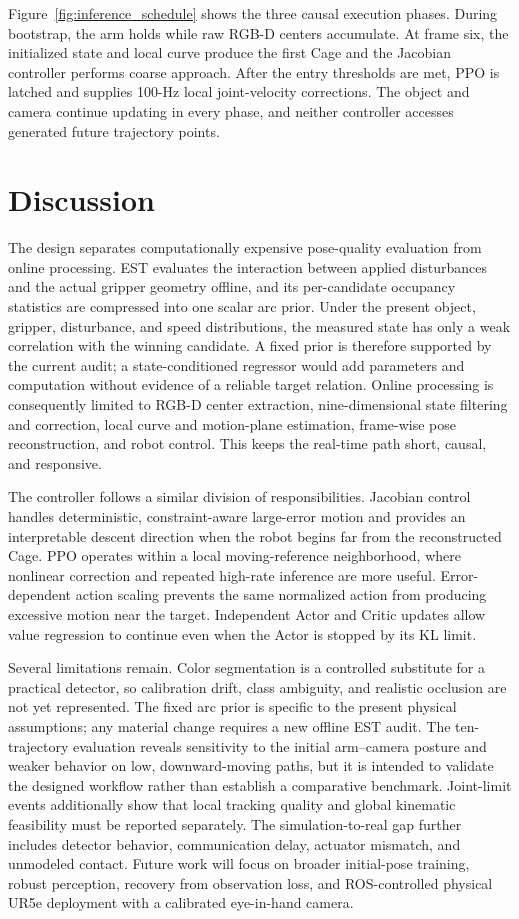 \documentclass[conference]{IEEEtran}
\begin{document}
Figure~\ref{fig:inference_schedule} shows the three causal execution phases. During bootstrap, the arm holds while raw RGB-D centers accumulate. At frame six, the initialized state and local curve produce the first Cage and the Jacobian controller performs coarse approach. After the entry thresholds are met, PPO is latched and supplies 100-Hz local joint-velocity corrections. The object and camera continue updating in every phase, and neither controller accesses generated future trajectory points.

\section{Discussion}

The design separates computationally expensive pose-quality evaluation from online processing. EST evaluates the interaction between applied disturbances and the actual gripper geometry offline, and its per-candidate occupancy statistics are compressed into one scalar arc prior. Under the present object, gripper, disturbance, and speed distributions, the measured state has only a weak correlation with the winning candidate. A fixed prior is therefore supported by the current audit; a state-conditioned regressor would add parameters and computation without evidence of a reliable target relation. Online processing is consequently limited to RGB-D center extraction, nine-dimensional state filtering and correction, local curve and motion-plane estimation, frame-wise pose reconstruction, and robot control. This keeps the real-time path short, causal, and responsive.

The controller follows a similar division of responsibilities. Jacobian control handles deterministic, constraint-aware large-error motion and provides an interpretable descent direction when the robot begins far from the reconstructed Cage. PPO operates within a local moving-reference neighborhood, where nonlinear correction and repeated high-rate inference are more useful. Error-dependent action scaling prevents the same normalized action from producing excessive motion near the target. Independent Actor and Critic updates allow value regression to continue even when the Actor is stopped by its KL limit.

Several limitations remain. Color segmentation is a controlled substitute for a practical detector, so calibration drift, class ambiguity, and realistic occlusion are not yet represented. The fixed arc prior is specific to the present physical assumptions; any material change requires a new offline EST audit. The ten-trajectory evaluation reveals sensitivity to the initial arm--camera posture and weaker behavior on low, downward-moving paths, but it is intended to validate the designed workflow rather than establish a comparative benchmark. Joint-limit events additionally show that local tracking quality and global kinematic feasibility must be reported separately. The simulation-to-real gap further includes detector behavior, communication delay, actuator mismatch, and unmodeled contact. Future work will focus on broader initial-pose training, robust perception, recovery from observation loss, and ROS-controlled physical UR5e deployment with a calibrated eye-in-hand camera.
\end{document}
